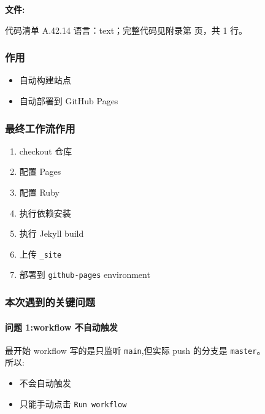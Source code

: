 \documentclass[lang=cn,scheme=chinese,color=blue,device=normal,toc=onecol,math=cm]{elegantbook}
\begin{document}
\textbf{文件:}\par


\begin{codeindexbox}{代码清单 A.42.14}
语言：text；完整代码见附录第 \pageref{code:42:14} 页，共 1 行。
\end{codeindexbox}


\subsubsection{作用}


\begin{itemize}
\item 自动构建站点
\item 自动部署到 GitHub Pages
\end{itemize}


\subsubsection{最终工作流作用}


\begin{enumerate}
\item checkout 仓库
\item 配置 Pages
\item 配置 Ruby
\item 执行依赖安装
\item 执行 Jekyll build
\item 上传 \texttt{\_\allowbreak{}site}
\item 部署到 \texttt{github-pages} environment
\end{enumerate}


\subsubsection{本次遇到的关键问题}


\paragraph{问题 1:workflow 不自动触发}


最开始 workflow 写的是只监听 \texttt{main},但实际 push 的分支是 \texttt{master}。\\ 所以:\par


\begin{itemize}
\item 不会自动触发
\item 只能手动点击 \texttt{Run workflow}
\end{itemize}
\end{document}
